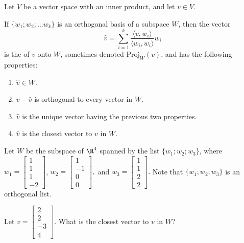 Let $V$ be a vector space with an inner product, and let $v\in V$.  

If $\{w_1; w_2; \ldots w_k\}$ is an orthogonal basis of a subspace $W$, then 
the vector 
\[ \hat{v} = \sum_{i=1}^k \frac{\langle v, w_i \rangle}{\langle w_i, w_i \rangle} w_i \]
is the {} of $v$ onto $W$, sometimes denoted $\mathrm{Proj}_W (v)$,
and has the following properties: 

\begin{enumerate}
\item $\hat{v} \in W$.
\item $v - \hat{v}$ is orthogonal to every vector in $W$. 
\item $\hat{v}$ is the unique vector having the previous two properties.  
\item $\hat{v}$ is the closest vector to $v$ in $W$.  
\end{enumerate}

\endedxtext



Let $W$ be the subspace of $\R^4$ spanned by the list $\{w_1; w_2; w_3\}$, where 
$w_1 = \left[\begin{array}{c} 1 \\ 1 \\ 1 \\ -2 
\end{array} \right]$, $w_2 = \left[\begin{array}{c} 1 \\ -1 \\ 0 \\ 0 
\end{array} \right], $ and $w_3 = \left[\begin{array}{c} 1 \\ 1 \\ 2 \\ 2 
\end{array} \right]. $  Note that $\{w_1; w_2; w_3\}$ is an orthogonal list.  

Let $v = \left[\begin{array}{c} 2 \\ 2 \\ -3 \\ 4 
\end{array} \right].$  What is the closest vector to $v$ in $W$?  





